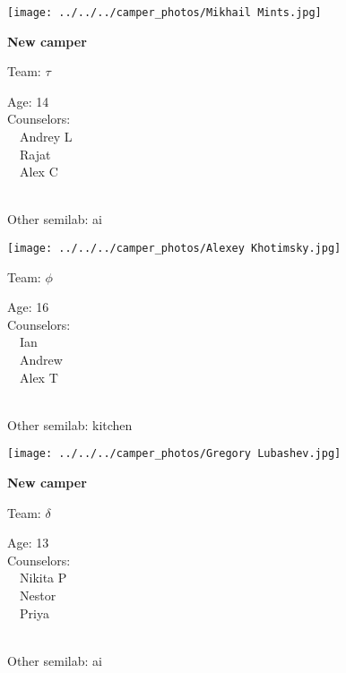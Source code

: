 \documentclass[10pt,letterpaper, landscape]{article}
\begin{document}
\horizontalshiftfornextsticker
\renewcommand{\baselinestretch}{1} \begin{sticker}
\noindent\begin{minipage}{0.5\textwidth}\texttt{[image: ../../../camper\_photos/Mikhail Mints.jpg]}\end{minipage}\begin{minipage}{0.45\textwidth}
\textbf{New camper} 

Team: {\Large $\tau$}

Age:        14\\
Counselors: \\\ \ Andrey L\\\ \ Rajat\\\ \ Alex C\\
\end{minipage} \\ \vspace{0.07in}
Other semilab: ai
\end{sticker}
\horizontalshiftfornextsticker
\renewcommand{\baselinestretch}{1} \begin{sticker}
\noindent\begin{minipage}{0.5\textwidth}\texttt{[image: ../../../camper\_photos/Alexey Khotimsky.jpg]}\end{minipage}\begin{minipage}{0.45\textwidth}
Team: {\Large $\phi$}

Age:        16\\
Counselors: \\\ \ Ian\\\ \ Andrew\\\ \ Alex T\\
\end{minipage} \\ \vspace{0.07in}
Other semilab: kitchen
\end{sticker}
\horizontalshiftfornextsticker
\renewcommand{\baselinestretch}{1} \begin{sticker}
\noindent\begin{minipage}{0.5\textwidth}\texttt{[image: ../../../camper\_photos/Gregory Lubashev.jpg]}\end{minipage}\begin{minipage}{0.45\textwidth}
\textbf{New camper} 

Team: {\Large $\delta$}

Age:        13\\
Counselors: \\\ \ Nikita P\\\ \ Nestor\\\ \ Priya\\
\end{minipage} \\ \vspace{0.07in}
Other semilab: ai
\end{sticker}
\end{document}
